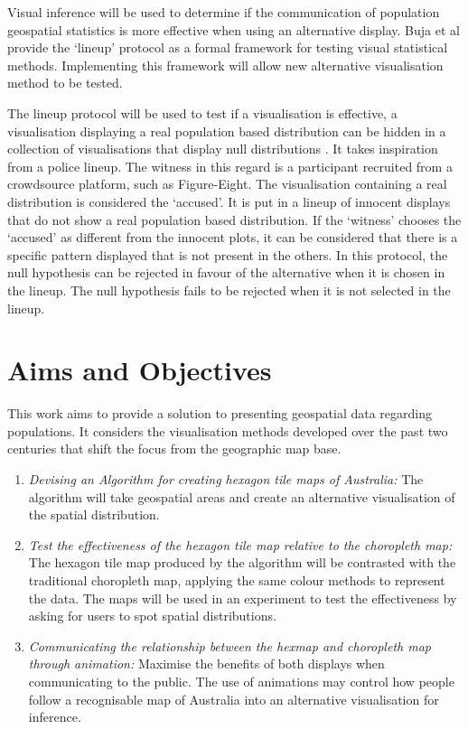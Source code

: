 \documentclass{monashthesis}
\begin{document}
Visual inference will be used to determine if the communication of population geospatial statistics is more effective when using an alternative display.
Buja et al \autocite{GIIV} provide the `lineup' protocol as a formal framework for testing visual statistical methods. Implementing this framework will allow new alternative visualisation method to be tested.

The lineup protocol will be used to test if a visualisation is effective, a visualisation displaying a real population based distribution can be hidden in a collection of visualisations that display null distributions \autocite{chowd}.
It takes inspiration from a police lineup.
The witness in this regard is a participant recruited from a crowdsource platform, such as Figure-Eight.
The visualisation containing a real distribution is considered the `accused'.
It is put in a lineup of innocent displays that do not show a real population based distribution.
If the `witness' chooses the `accused' as different from the innocent plots, it can be considered that there is a specific pattern displayed that is not present in the others.
In this protocol, the null hypothesis can be rejected in favour of the alternative when it is chosen in the lineup. The null hypothesis fails to be rejected when it is not selected in the lineup.

\hypertarget{aims-and-objectives}{%
\section{Aims and Objectives}\label{aims-and-objectives}}

This work aims to provide a solution to presenting geospatial data regarding populations.
It considers the visualisation methods developed over the past two centuries that shift the focus from the geographic map base.

\begin{enumerate}
\def\labelenumi{\arabic{enumi}.}
\item
  \emph{Devising an Algorithm for creating hexagon tile maps of Australia:} The algorithm will take geospatial areas and create an alternative visualisation of the spatial distribution.
\item
  \emph{Test the effectiveness of the hexagon tile map relative to the choropleth map:} The hexagon tile map produced by the algorithm will be contrasted with the traditional choropleth map, applying the same colour methods to represent the data. The maps will be used in an experiment to test the effectiveness by asking for users to spot spatial distributions.
\item
  \emph{Communicating the relationship between the hexmap and choropleth map through animation:} Maximise the benefits of both displays when communicating to the public. The use of animations may control how people follow a recognisable map of Australia into an alternative visualisation for inference.
\end{enumerate}
\end{document}
